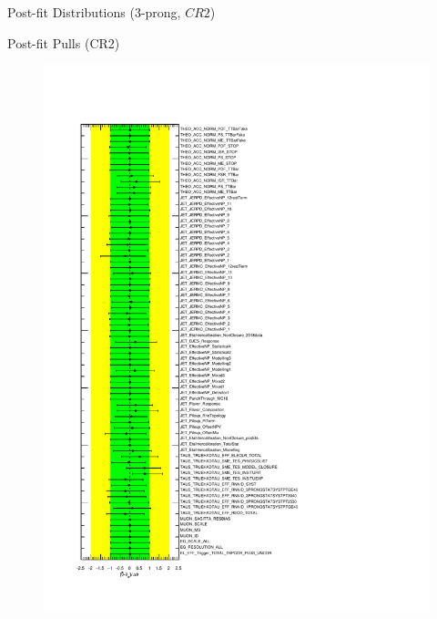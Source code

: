 \documentclass[aspectratio=46, dvipdfmx, 10pt, t]{beamer} %
\begin{document}
\begin{frame}{Post-fit Distributions (3-prong, $CR2$)}
\begin{figure}
  \end{figure}
\end{frame}

\begin{frame}{Post-fit Pulls (CR2)}
  \begin{figure}
    \includegraphics[scale=0.3]{pull_pulls_stGE400LT500}
  \end{figure}
\end{frame}
\end{document}
